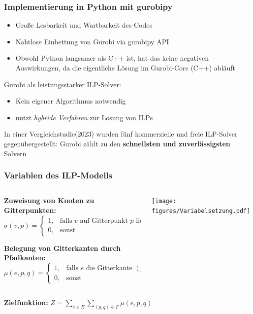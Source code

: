 \documentclass[9pt]{beamer}
\begin{document}
    \begin{frame}
    \frametitle{Implementierung in Python mit gurobipy}
    \begin{itemize}
        \item Große Lesbarkeit und Wartbarkeit des Codes
        \item Nahtlose Einbettung von Gurobi via gurobipy API
        \item Obwohl Python langsamer als C++ ist, hat das keine negativen Auswirkungen, da die eigentliche Lösung im Gurobi-Core (C++) abläuft
    \end{itemize}\pause 
    Gurobi als leistungsstarker ILP-Solver:
    \begin{itemize}
        \item Kein eigener Algorithmus notwendig
        \item nutzt \textit{hybride Verfahren} zur Lösung von ILPs
    \end{itemize}\pause 
    In einer Vergleichstudie(2023) wurden fünf kommerzielle und freie ILP-Solver gegenübergestellt: Gurobi zählt zu den \textbf{schnellsten und zuverlässigsten} Solvern
    
    \end{frame}
    
    \begin{frame}
    \frametitle{Variablen des ILP-Modells}
    \begin{columns}
  \begin{column}{0.45\textwidth}
    \textbf{Zuweisung von Knoten zu Gitterpunkten:}
    \[
    \sigma(v, p) =
    \begin{cases}
    1, & \text{falls } v \text{ auf Gitterpunkt } p \text{ liegt} \\
    0, & \text{sonst}
    \end{cases}
    \]

    \vspace{0.5em}
    \textbf{Belegung von Gitterkanten durch Pfadkanten:}
    \[
    \mu(e, p, q) =
    \begin{cases}
    1, & \text{falls } e \text{ die Gitterkante } (p, q) \text{ nutzt} \\
    0, & \text{sonst}
    \end{cases}
    \]
  \end{column}
  \pause 
  \begin{column}{0.4\textwidth}
    \centering
    \texttt{[image: figures/Variabelsetzung.pdf]}
  \end{column}
\end{columns}\pause 
\vspace{0.5em}
\textbf{Zielfunktion:} $Z = \sum_{e \in E} \sum_{(p,q) \in F} \mu(e,p,q)$
    \end{frame}
\end{document}
